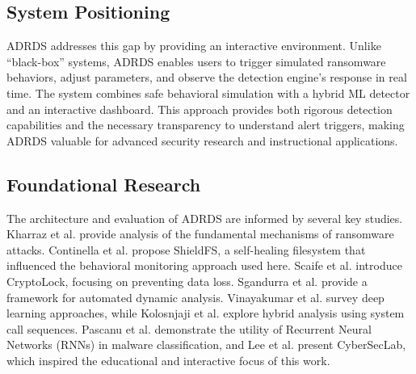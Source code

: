 \subsection{System Positioning}

ADRDS addresses this gap by providing an interactive environment. Unlike ``black-box'' systems, ADRDS enables users to trigger simulated ransomware behaviors, adjust parameters, and observe the detection engine's response in real time. The system combines safe behavioral simulation with a hybrid ML detector and an interactive dashboard. This approach provides both rigorous detection capabilities and the necessary transparency to understand alert triggers, making ADRDS valuable for advanced security research and instructional applications.

\subsection{Foundational Research}

The architecture and evaluation of ADRDS are informed by several key studies. Kharraz et al. \cite{kharraz2015cutting} provide analysis of the fundamental mechanisms of ransomware attacks. Continella et al. \cite{continella2016shieldfs} propose ShieldFS, a self-healing filesystem that influenced the behavioral monitoring approach used here. Scaife et al. \cite{scaife2016cryptolock} introduce CryptoLock, focusing on preventing data loss. Sgandurra et al. \cite{sgandurra2016automated} provide a framework for automated dynamic analysis. Vinayakumar et al. \cite{vinayakumar2019deep} survey deep learning approaches, while Kolosnjaji et al. \cite{kolosnjaji2018deep} explore hybrid analysis using system call sequences. Pascanu et al. \cite{pascanu2013malware} demonstrate the utility of Recurrent Neural Networks (RNNs) in malware classification, and Lee et al. \cite{lee2022cyberseclab} present CyberSecLab, which inspired the educational and interactive focus of this work.
